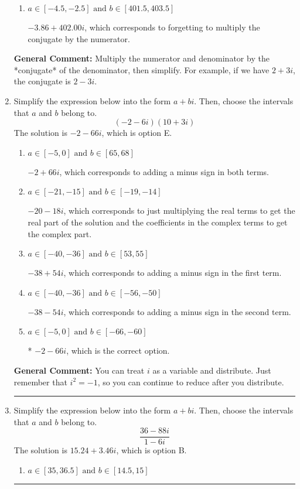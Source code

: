 \documentclass{extbook}[14pt]
\newcommand{\litem}[1]{\item #1

\rule{\textwidth}{0.4pt}}
\begin{document}
\begin{enumerate}
{\begin{enumerate}[label=\Alph*.]
 $-386.00  + 4.02 i$, which corresponds to forgetting to multiply the conjugate by the numerator and using a plus instead of a minus in the denominator.
\item \( a \in [-4.5, -2.5] \text{ and } b \in [401.5, 403.5] \)

 $-3.86  + 402.00 i$, which corresponds to forgetting to multiply the conjugate by the numerator.
\end{enumerate}

\textbf{General Comment:} Multiply the numerator and denominator by the *conjugate* of the denominator, then simplify. For example, if we have $2+3i$, the conjugate is $2-3i$.
}
\litem{
Simplify the expression below into the form $a+bi$. Then, choose the intervals that $a$ and $b$ belong to.
\[ (-2 - 6 i)(10 + 3 i) \]The solution is \( -2 - 66 i \), which is option E.\begin{enumerate}[label=\Alph*.]
\item \( a \in [-5, 0] \text{ and } b \in [65, 68] \)

 $-2 + 66 i$, which corresponds to adding a minus sign in both terms.
\item \( a \in [-21, -15] \text{ and } b \in [-19, -14] \)

 $-20 - 18 i$, which corresponds to just multiplying the real terms to get the real part of the solution and the coefficients in the complex terms to get the complex part.
\item \( a \in [-40, -36] \text{ and } b \in [53, 55] \)

 $-38 + 54 i$, which corresponds to adding a minus sign in the first term.
\item \( a \in [-40, -36] \text{ and } b \in [-56, -50] \)

 $-38 - 54 i$, which corresponds to adding a minus sign in the second term.
\item \( a \in [-5, 0] \text{ and } b \in [-66, -60] \)

* $-2 - 66 i$, which is the correct option.
\end{enumerate}

\textbf{General Comment:} You can treat $i$ as a variable and distribute. Just remember that $i^2=-1$, so you can continue to reduce after you distribute.
}
\litem{
Simplify the expression below into the form $a+bi$. Then, choose the intervals that $a$ and $b$ belong to.
\[ \frac{36 - 88 i}{1 - 6 i} \]The solution is \( 15.24  + 3.46 i \), which is option B.\begin{enumerate}[label=\Alph*.]
\item \( a \in [35, 36.5] \text{ and } b \in [14.5, 15] \)


\end{enumerate}}
\end{enumerate}
\end{document}
